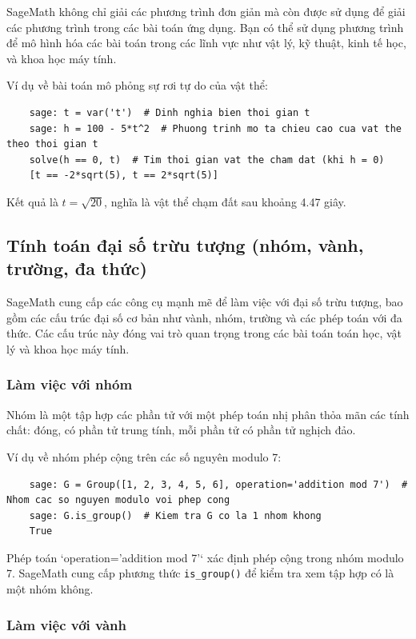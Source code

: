 SageMath không chỉ giải các phương trình đơn giản mà còn được sử dụng để giải các phương trình trong các bài toán ứng dụng. Bạn có thể sử dụng phương trình để mô hình hóa các bài toán trong các lĩnh vực như vật lý, kỹ thuật, kinh tế học, và khoa học máy tính.

Ví dụ về bài toán mô phỏng sự rơi tự do của vật thể:

\begin{lstlisting}
	sage: t = var('t')  # Dinh nghia bien thoi gian t
	sage: h = 100 - 5*t^2  # Phuong trinh mo ta chieu cao cua vat the theo thoi gian t
	solve(h == 0, t)  # Tim thoi gian vat the cham dat (khi h = 0)
	[t == -2*sqrt(5), t == 2*sqrt(5)]
\end{lstlisting}

Kết quả là \(t = \sqrt{20}\), nghĩa là vật thể chạm đất sau khoảng 4.47 giây.


\subsection{Tính toán đại số trừu tượng (nhóm, vành, trường, đa thức)}

SageMath cung cấp các công cụ mạnh mẽ để làm việc với đại số trừu tượng, bao gồm các cấu trúc đại số cơ bản như vành, nhóm, trường và các phép toán với đa thức. Các cấu trúc này đóng vai trò quan trọng trong các bài toán toán học, vật lý và khoa học máy tính.

\subsubsection{Làm việc với nhóm}

Nhóm là một tập hợp các phần tử với một phép toán nhị phân thỏa mãn các tính chất: đóng, có phần tử trung tính, mỗi phần tử có phần tử nghịch đảo.

Ví dụ về nhóm phép cộng trên các số nguyên modulo 7:

\begin{lstlisting}
	sage: G = Group([1, 2, 3, 4, 5, 6], operation='addition mod 7')  # Nhom cac so nguyen modulo voi phep cong
	sage: G.is_group()  # Kiem tra G co la 1 nhom khong
	True
\end{lstlisting}

Phép toán `operation='addition mod 7'` xác định phép cộng trong nhóm modulo 7. SageMath cung cấp phương thức \texttt{is\_group()} để kiểm tra xem tập hợp có là một nhóm không.

\subsubsection{Làm việc với vành}

